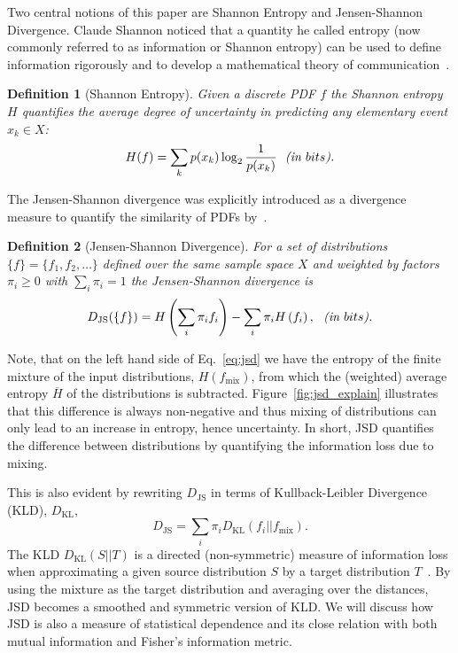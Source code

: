 \documentclass[a4paper]{article}
\newtheorem{define}{Definition}
\begin{document}
Two central notions of this paper are Shannon Entropy and
Jensen-Shannon Divergence. Claude Shannon noticed that a quantity he
called entropy (now commonly referred to as information or Shannon
entropy) can be used to define information rigorously and to develop a
mathematical theory of communication~\citep{shannon1948}.
\begin{define}[Shannon Entropy]
\label{def:shannon}
Given a discrete PDF $f$ the Shannon entropy $H$ quantifies the
average degree of uncertainty in predicting any elementary event
$x_k \in X$:
\begin{equation}
\label{eq:entropy}
H(f) = \sum_k p(x_k) \log_2 \frac{1}{p(x_k)}~~\text{\emph{(in $bits$).}}
\end{equation}
\end{define}

The Jensen-Shannon divergence was explicitly introduced as a
divergence measure to quantify the similarity of PDFs
by~\citet{lin1991}.
\begin{define}[Jensen-Shannon Divergence]
\label{def:jsd}
For a set of distributions $\{f\} = \{f_1, f_2,\ldots\}$ defined over the same sample space $X$ and weighted by factors $\pi_i \geq 0$ with $\sum_i\pi_i = 1$ the Jensen-Shannon divergence is
\begin{equation}
\label{eq:jsd}
D_\text{JS}(\{f\}) = H\left(\sum_i \pi_i f_i\right) - 
       \sum_i \pi_i H\left(f_i\right),~~\text{\emph{(in $bits$).}}
\end{equation}
\end{define}
Note, that on the left hand side of Eq.~\ref{eq:jsd} we have the
entropy of the finite mixture of the input distributions,
$H(f_\text{mix})$, from which the (weighted) average entropy
$\overline{H}$ of the distributions is subtracted.
Figure~\ref{fig:jsd_explain} illustrates that this difference is
always non-negative and thus mixing of distributions can only lead to
an increase in entropy, hence uncertainty. In short, JSD quantifies
the difference between distributions by quantifying the information
loss due to mixing.

This is also evident by rewriting $D_\text{JS}$ in terms of
Kullback-Leibler Divergence (KLD), $D_\text{KL}$,
\begin{equation}
\label{eq:jsd_kld}
D_\text{JS} = \sum_i \pi_i D_\text{KL}(f_i || f_\text{mix}).
\end{equation}
The KLD $D_\text{KL}(S || T)$ is a directed (non-symmetric) measure of
information loss when approximating a given source distribution $S$ by
a target distribution $T$~\cite{kullback1951}. By using the mixture as
the target distribution and averaging over the distances, JSD becomes
a smoothed and symmetric version of KLD. We will discuss how JSD is
also a measure of statistical dependence and its close relation with
both mutual information and Fisher's information metric.
\end{document}
